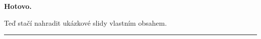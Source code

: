 {%
  \begin{frame}
    \vfill
    \hspace*{12mm}%
    \begin{minipage}{.76\paperwidth}
      {\color{vsakOrange}\Huge\bfseries Hotovo.}\par
      \vspace{4mm}
      {\color{white}\large
        Teď stačí nahradit ukázkové slidy vlastním obsahem.
      }
      \vspace{7mm}

      {\color{vsakPanelBlue}\rule{.62\linewidth}{1.2pt}}
    \end{minipage}
    \vfill
  \end{frame}
}
